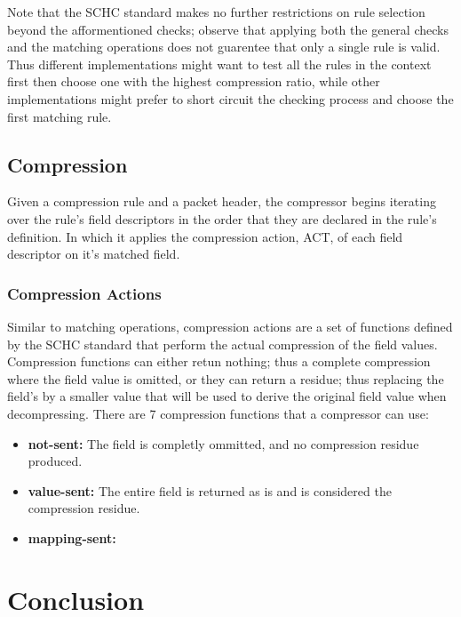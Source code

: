 \documentclass[12pt]{dalthesis}
\begin{document}
	Note that the SCHC standard makes no further restrictions on rule selection beyond the afformentioned checks; observe that applying both the 
	general checks and the matching operations does not guarentee
	that only a single rule is valid. Thus different implementations might want to test all the rules in the context first then choose one
	with the highest compression ratio, while other implementations might prefer to short circuit the checking process and choose the first matching
	rule. 
	\vspace{3em}
	\section{Compression}
	Given a compression rule and a packet header, the compressor begins iterating over the rule's field descriptors in the order that they
	are declared in the rule's definition. In which it applies the compression action, ACT,  of each field descriptor on it's matched field.

	\subsection{Compression Actions}
	Similar to matching operations, compression actions are a set of functions defined by the SCHC standard that perform the actual compression
	of the field values. Compression functions can either retun nothing; thus a complete compression where the field value is omitted, or they
	can return a residue; thus replacing the field's by a smaller value that will be used to derive the original field value
	when decompressing. There are 7 compression functions that a compressor can use:
	\begin{itemize}
		\item \textbf{not-sent:} The field is completly ommitted, and no compression residue produced.
		\item \textbf{value-sent:} The entire field is returned as is and is considered the compression residue.
		\item \textbf{mapping-sent:} 
	\end{itemize}
\chapter{Conclusion}




\end{document}
